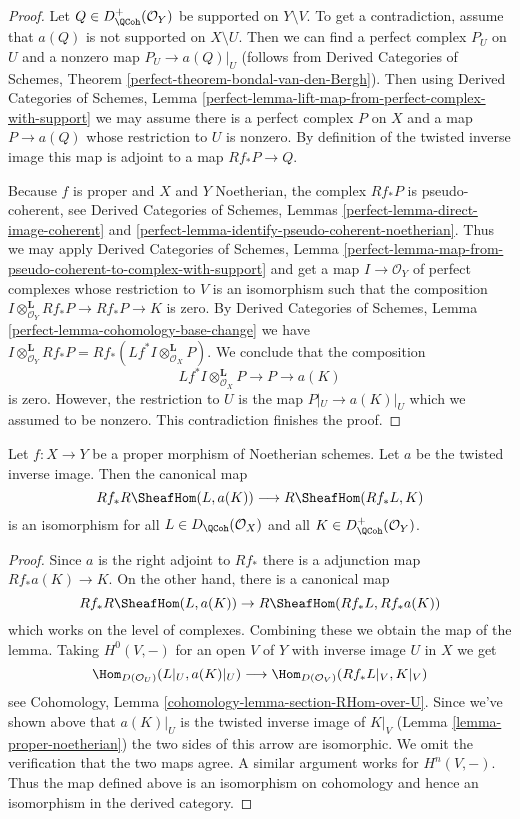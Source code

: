 \begin{proof}
Let $Q \in D^+_\QCoh(\mathcal{O}_Y)$ be supported on $Y \setminus V$.
To get a contradiction, assume that $a(Q)$ is not supported on
$X \setminus U$. Then we can find a perfect complex $P_U$ on $U$
and a nonzero map $P_U \to a(Q)|_U$ (follows from
Derived Categories of Schemes, Theorem
\ref{perfect-theorem-bondal-van-den-Bergh}). Then using
Derived Categories of Schemes, Lemma
\ref{perfect-lemma-lift-map-from-perfect-complex-with-support}
we may assume there is a perfect complex $P$ on $X$ and a map
$P \to a(Q)$ whose restriction to $U$ is nonzero.
By definition of the twisted inverse image this map
is adjoint to a map $Rf_*P \to Q$.

\medskip\noindent
Because $f$ is proper and $X$ and $Y$ Noetherian, the complex
$Rf_*P$ is pseudo-coherent, see
Derived Categories of Schemes, Lemmas
\ref{perfect-lemma-direct-image-coherent} and
\ref{perfect-lemma-identify-pseudo-coherent-noetherian}.
Thus we may apply
Derived Categories of Schemes, Lemma
\ref{perfect-lemma-map-from-pseudo-coherent-to-complex-with-support}
and get a map $I \to \mathcal{O}_Y$ of perfect complexes
whose restriction to $V$ is an isomorphism such that the composition
$I \otimes^\mathbf{L}_{\mathcal{O}_Y} Rf_*P \to Rf_*P \to K$ is zero.
By Derived Categories of Schemes, Lemma
\ref{perfect-lemma-cohomology-base-change}
we have $I \otimes^\mathbf{L}_{\mathcal{O}_Y} Rf_*P =
Rf_*(Lf^*I \otimes^\mathbf{L}_{\mathcal{O}_X} P)$.
We conclude that the composition
$$
Lf^*I \otimes^\mathbf{L}_{\mathcal{O}_X} P \to P \to a(K)
$$
is zero. However, the restriction to $U$ is the map
$P|_U \to a(K)|_U$ which we assumed to be nonzero.
This contradiction finishes the proof.
\end{proof}

\begin{lemma}
\label{lemma-proper-noetherian-relative}
Let $f : X \to Y$ be a proper morphism of Noetherian schemes.
Let $a$ be the twisted inverse image. Then the canonical map
$$
Rf_*R\SheafHom(L, a(K)) \longrightarrow R\SheafHom(Rf_*L, K)
$$
is an isomorphism for all $L \in D_\QCoh(\mathcal{O}_X)$ and all
$K \in D^+_\QCoh(\mathcal{O}_Y)$.
\end{lemma}

\begin{proof}
Since $a$ is the right adjoint to $Rf_*$ there is a adjunction
map $Rf_*a(K) \to K$. On the other hand, there is a canonical
map
$$
Rf_*R\SheafHom(L, a(K)) \to R\SheafHom(Rf_*L, Rf_*a(K))
$$
which works on the level of complexes. Combining these we obtain
the map of the lemma. Taking $H^0(V, -)$ for an open $V$ of $Y$
with inverse image $U$ in $X$ we get
$$
\Hom_{D(\mathcal{O}_U)}(L|_U, a(K)|_U) \longrightarrow
\Hom_{D(\mathcal{O}_V)}(Rf_*L|_V, K|_V)
$$
see Cohomology, Lemma \ref{cohomology-lemma-section-RHom-over-U}.
Since we've shown above that $a(K)|_U$ is the twisted inverse
image of $K|_V$ (Lemma \ref{lemma-proper-noetherian}) the two
sides of this arrow are isomorphic. We omit the verification that
the two maps agree. A similar argument works for $H^n(V, -)$.
Thus the map defined above is an isomorphism on cohomology
and hence an isomorphism in the derived category.
\end{proof}

